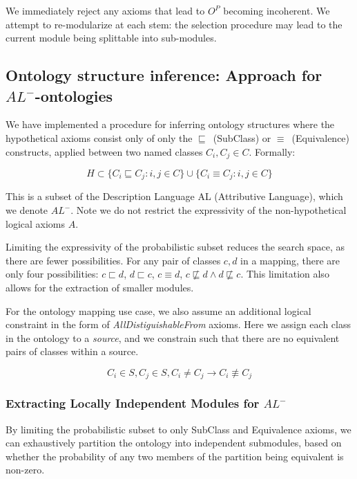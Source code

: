 \documentclass{my}
\begin{document}
We immediately reject any axioms that lead to $O^P$ becoming
incoherent.
We attempt to re-modularize at each stem: the selection procedure may
lead to the current module being splittable into sub-modules.

\subsection{Ontology structure inference: Approach for $AL^{-}$-ontologies}

We have implemented a procedure for inferring ontology structures
where the hypothetical axioms consist only of only the
$\sqsubseteq$\ (SubClass) or $\equiv$\ (Equivalence) constructs,
applied between two named classes $C_i, C_j \in C$. Formally:

\begin{equation}
H \subset \{  C_i \sqsubseteq C_j : i,j \in C \} \cup \{  C_i \equiv C_j : i,j \in C \}
\end{equation}

This is a subset of the Description Language AL (Attributive
Language), which we denote $AL^{-}$. Note we do not restrict the expressivity of
the non-hypothetical logical axioms $A$.

Limiting the expressivity of the probabilistic subset reduces the
search space, as there are fewer possibilities. For any pair of
classes $c,d$ in a mapping, there are only four possibilities: $c \sqsubset d$, $d \sqsubset c$, $c \equiv d$, $c \not\sqsubseteq d \wedge d \not\sqsubseteq c $. This
limitation also allows for the extraction of smaller modules.

For the ontology mapping use case, we also assume an additional
logical constraint in the form of \emph{AllDistiguishableFrom}
axioms. Here we assign each class in the ontology to a \emph{source},
and we constrain such that there are no equivalent pairs of classes
within a source.

\begin{equation}
C_i \in S, C_j \in S, C_i \neq C_j \to C_i \not\equiv C_j
\end{equation}

\subsubsection{Extracting Locally Independent Modules for $AL^{-}$}

By limiting the probabilistic subset to only SubClass and Equivalence
axioms, we can exhaustively partition the ontology into independent
submodules, based on whether the probability of any two members of the
partition being equivalent is non-zero.
\end{document}

